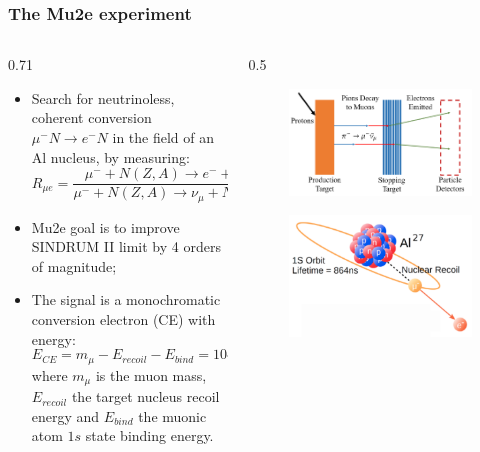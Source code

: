 \documentclass{beamer}
\begin{document}
\begin{frame}
    \frametitle{The Mu2e experiment}
    \vspace{-3mm}
\begin{columns}
    \begin{column}{0.71\framewidth}
        \begin{itemize}
            \item Search for neutrinoless, coherent conversion $\mu^- N \rightarrow e^- N$ in the field of an Al nucleus, by measuring: 
            $$R_{\mu e}=\frac{\mu^{-}+N(Z, A) \rightarrow e^{-}+N(Z, A)}{\mu^{-}+N(Z, A) \rightarrow \nu_\mu+N(Z-1, A)}$$
            \item Mu2e goal is to improve SINDRUM II limit by 4 orders of magnitude;
            \item The signal is a monochromatic conversion electron (CE) with energy: 
            $$ E_{CE} = m_\mu - E_{recoil} - E_{bind} = 104.97 \ \text{MeV}$$
            where $m_\mu$ is the muon mass, $E_{recoil}$ the target nucleus recoil energy and $E_{bind}$ the muonic atom $1s$ state binding energy.
        \end{itemize}
    \end{column}
    \begin{column}{0.5\framewidth}
        \begin{figure}[h]
            \centering
            \includegraphics[width=0.9\columnwidth]{figures/png/Screenshot_20240913_161505.png}
        \end{figure} 
                \begin{figure}[h]
            \centering
            \includegraphics[width=0.75\columnwidth]{figures/png/Screenshot_20240913_160115.png}

\end{figure}
\end{column}
\end{columns}
\end{frame}
\end{document}
